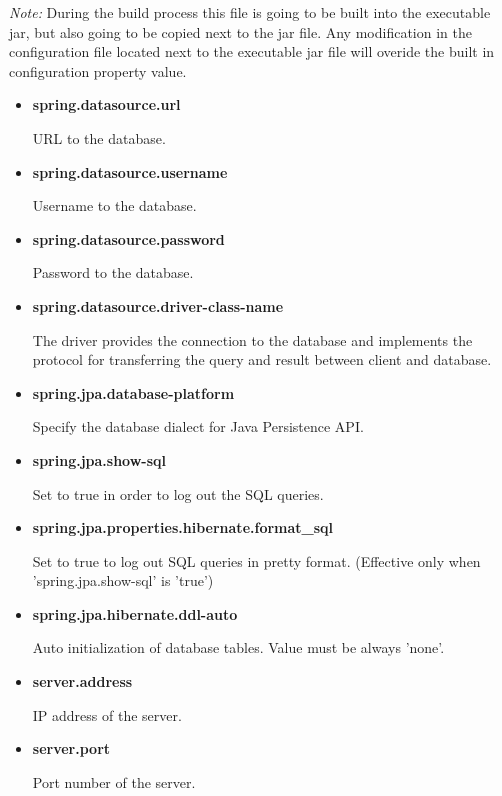 \documentclass[a4paper]{arrowhead}
\begin{document}
\textit{Note:} During the build process this file is going to be built into the executable jar, but also going to be copied next to the jar file. Any modification in the configuration file located next to the executable jar file will overide the built in configuration property value.
  \begin{itemize}
  \item \textbf{spring.datasource.url}
  
   URL to the database.
  
  \item \textbf{spring.datasource.username}
  
  Username to the database.
  
  \item \textbf{spring.datasource.password}
  
  Password to the database.
  
  \item \textbf{spring.datasource.driver-class-name}
  
  The driver provides the connection to the database and implements the protocol for transferring the query and result between client and database.
  
  \item \textbf{spring.jpa.database-platform}
  
  Specify the database dialect for Java Persistence API.
  
  \item \textbf{spring.jpa.show-sql}
  
  Set to true in order to log out the SQL queries.
  
  \item \textbf{spring.jpa.properties.hibernate.format\_sql}
  
  Set to true to log out SQL queries in pretty format. (Effective only when 'spring.jpa.show-sql' is 'true')
  
  \item \textbf{spring.jpa.hibernate.ddl-auto}
  
  Auto initialization of database tables. Value must be always 'none'.
  
  \item \textbf{server.address}
  
  IP address of the server.
  
  \item \textbf{server.port}
  
  Port number of the server.
  

\end{itemize}
\end{document}
